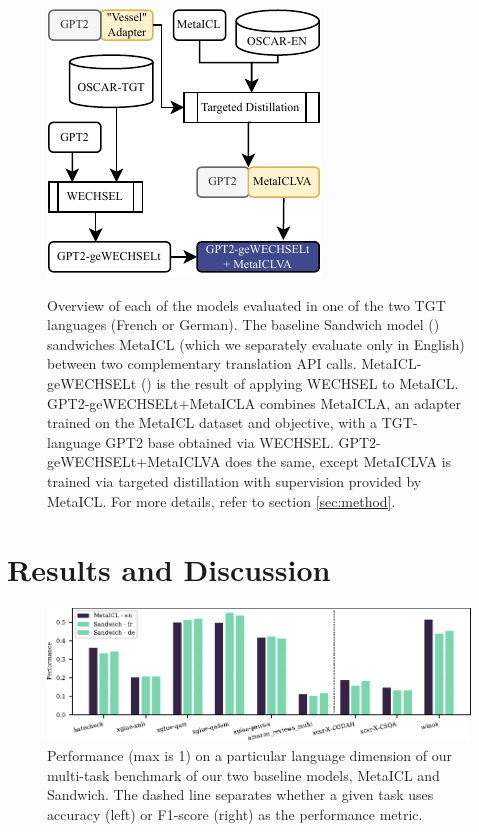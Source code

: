 \documentclass[11pt]{article}
\begin{document}
\begin{figure}[ht]
	\hfill
	\subcaptionbox{}
	{\includegraphics{gpt2-gewechselt+metaiclva.pdf}}
	\caption{Overview of each of the models evaluated in one of the two TGT
		languages (French or German). The baseline
		\textcolor[HTML]{79d6ae}{Sandwich} model () sandwiches
		\textcolor[HTML]{332345}{MetaICL} \citep{min_metaicl_2022} (which we
		separately evaluate only in English) between two complementary translation
		API calls. \textcolor[HTML]{38AAAC}{MetaICL-geWECHSELt}
		() is the result of applying WECHSEL
		\citep{minixhofer_wechsel_2022} to MetaICL.
		\textcolor[HTML]{357aa2}{GPT2-geWECHSELt+MetaICLA} combines
		\textcolor{Dandelion}{MetaICLA}, an adapter trained on the MetaICL dataset
		and objective, with a TGT-language GPT2 base obtained via WECHSEL.
		\textcolor[HTML]{40498e}{GPT2-geWECHSELt+MetaICLVA} does the same, except
		\textcolor{Dandelion}{MetaICLVA} is trained via targeted distillation with
		supervision provided by MetaICL. For more details, refer to section
		\ref{sec:method}.}
\end{figure}

\section{Results and Discussion}
\begin{figure}
	\includegraphics{baselines.pdf}
	\caption{Performance (max is 1) on a particular language dimension of our multi-task benchmark of our two
		baseline models, MetaICL and Sandwich. The dashed line separates whether a given task uses
		accuracy (left) or F1-score (right) as the performance metric.}
	\label{fig:baselines}
\end{figure}
\end{document}
